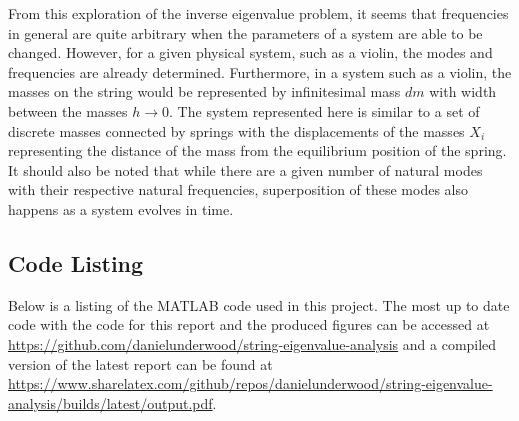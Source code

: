 \documentclass[10pt,a4paper]{article}
\begin{document}
\begin{multicols*}{2}
From this exploration of the inverse eigenvalue problem, it seems that frequencies in general are quite arbitrary when the parameters of a system are able to be changed. However, for a given physical system, such as a violin, the modes and frequencies are already determined. Furthermore, in a system such as a violin, the masses on the string would be represented by infinitesimal mass $dm$ with width between the masses $h \to 0$. The system represented here is similar to a set of discrete masses connected by springs with the displacements of the masses $X_i$ representing the distance of the mass from the equilibrium position of the spring. It should also be noted that while there are a given number of natural modes with their respective natural frequencies, superposition of these modes also happens as a system evolves in time.

\end{multicols*}



\begin{appendices}
	\section{Code Listing} \label{app: Code Listing}

	Below is a listing of the MATLAB code used in this project. The most up to date code with the code for this report and the produced figures can be accessed at \url{https://github.com/danielunderwood/string-eigenvalue-analysis} and a compiled version of the latest report can be found at \url{https://www.sharelatex.com/github/repos/danielunderwood/string-eigenvalue-analysis/builds/latest/output.pdf}.

	
\end{appendices}
\end{document}
